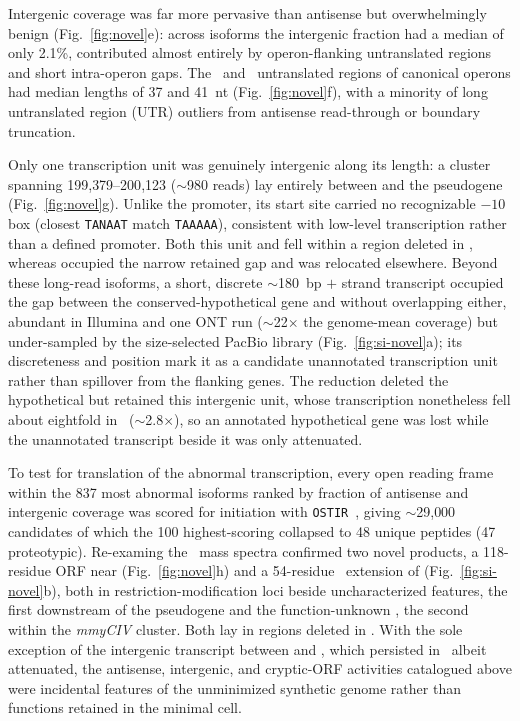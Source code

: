 Intergenic coverage was far more pervasive than antisense but overwhelmingly benign (Fig.~\ref{fig:novel}e): across isoforms the intergenic fraction had a median of only 2.1\%, contributed almost entirely by operon-flanking untranslated regions and short intra-operon gaps.
The \fiveprime~and \threeprime~untranslated regions of canonical operons had median lengths of 37 and 41~nt (Fig.~\ref{fig:novel}f), with a minority of long untranslated region (UTR) outliers from antisense read-through or boundary truncation.

Only one transcription unit was genuinely intergenic along its length: a cluster spanning 199{,}379--200{,}123 ($\sim$980 reads) lay entirely between  and the pseudogene  (Fig.~\ref{fig:novel}g).
Unlike the  promoter, its start site carried no recognizable $-10$ box (closest \texttt{TANAAT} match \texttt{TAAAAA}), consistent with low-level transcription rather than a defined promoter.
Both this unit and  fell within a region deleted in \syna, whereas  occupied the narrow retained gap and was relocated elsewhere.
Beyond these long-read isoforms, a short, discrete $\sim$180~bp $+$ strand transcript occupied the gap between the conserved-hypothetical gene  and  without overlapping either, abundant in Illumina and one ONT run ($\sim$22$\times$ the genome-mean coverage) but under-sampled by the size-selected PacBio library (Fig.~\ref{fig:si-novel}a); its discreteness and position mark it as a candidate unannotated transcription unit rather than spillover from the flanking genes.
The reduction deleted the hypothetical  but retained this intergenic unit, whose transcription nonetheless fell about eightfold in \syna~($\sim$2.8$\times$), so an annotated hypothetical gene was lost while the unannotated transcript beside it was only attenuated.

To test for translation of the abnormal transcription, every open reading frame within the 837 most abnormal isoforms ranked by fraction of antisense and intergenic coverage was scored for initiation with \texttt{OSTIR}~\cite{roots_ostir_2021}, giving $\sim$29{,}000 candidates of which the 100 highest-scoring collapsed to 48 unique peptides (47 proteotypic).
Re-examing the \syn~mass spectra confirmed two novel products, a 118-residue ORF near  (Fig.~\ref{fig:novel}h) and a 54-residue \fiveprime~extension of  (Fig.~\ref{fig:si-novel}b), both in restriction-modification loci beside uncharacterized features, the first downstream of the  pseudogene and the function-unknown , the second within the \textit{mmyCIV} cluster.
Both lay in regions deleted in \syna. With the sole exception of the intergenic transcript between  and , which persisted in \syna~albeit attenuated, the antisense, intergenic, and cryptic-ORF activities catalogued above were incidental features of the unminimized synthetic genome rather than functions retained in the minimal cell.

